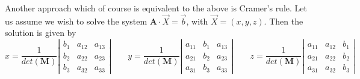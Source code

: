 Another approach which of course is equivalent to the above is Cramer's rule. 
Let us assume we wish to solve the 
system $\bm A \cdot \vec X = \vec b$, with $\vec X=(x,y,z)$. Then the solution is given by
\[
x=
\frac{1}{det(\bm M)}
\left| 
\begin{array}{ccc}
b_1 & a_{12} & a_{13} \\
b_2 & a_{22} & a_{23} \\
b_3 & a_{32} & a_{33}
\end{array}
\right|
\qquad
y=
\frac{1}{det(\bm M)}
\left| 
\begin{array}{ccc}
a_{11} & b_1 & a_{13} \\
a_{21} & b_2 & a_{23} \\
a_{31} & b_3 & a_{33} 
\end{array}
\right|
\qquad
z=
\frac{1}{det(\bm M)}
\left| 
\begin{array}{ccc}
a_{11} & a_{12} & b_1\\
a_{21} & a_{22} & b_2\\
a_{31} & a_{32} & b_3
\end{array}
\right|
\]




